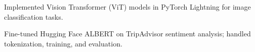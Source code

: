 \begin{cventries}
{\begin{cvitemsfree}
                \item{Implemented Vision Transformer (ViT) models in PyTorch Lightning for image classification tasks.}
                \item{Fine-tuned Hugging Face ALBERT on TripAdvisor sentiment analysis; handled tokenization, training, and evaluation.}
            \end{cvitemsfree}
        }
\end{cventries}